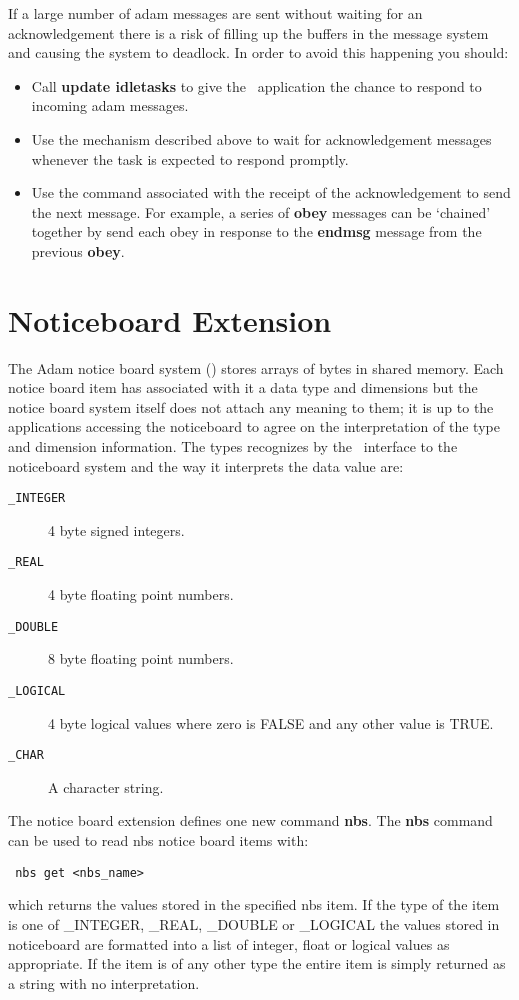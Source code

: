 If a large number of adam messages are sent without waiting for an 
acknowledgement there is a risk of filling up the buffers in the message 
system and causing the system to deadlock. In order to avoid this 
happening you should:
\begin{itemize}
\item Call {\bf update idletasks} to give the \Tcl\ application the chance 
to respond to incoming adam messages.
\item Use the mechanism described above to wait for acknowledgement 
messages whenever the task is expected to respond promptly.
\item Use the command associated with the receipt of the acknowledgement to
send the next message. For example, a series of {\bf obey} messages can 
be `chained'
together by send each obey in response to the {\bf endmsg} message from the
previous {\bf obey}.
\end{itemize}

\section{\label{noticeboard_extension}Noticeboard Extension}

The Adam notice board system () stores arrays of 
bytes in shared memory.
Each notice board item has associated with it a data type and dimensions but
the notice board system itself does not attach any meaning to them; it is
up to the applications accessing the noticeboard to agree on the interpretation
of the type and dimension information. The types recognizes by the \TclTk\ 
interface to the noticeboard system and the way it interprets the data 
value are:

\begin{description}
\item[{\tt \_INTEGER}] 4 byte signed integers.
\item[{\tt \_REAL}] 4 byte floating point numbers.
\item[{\tt \_DOUBLE}] 8 byte floating point numbers.
\item[{\tt \_LOGICAL}] 4 byte logical values where zero is FALSE and any 
other value is TRUE.
\item[{\tt \_CHAR}] A character string.
\end{description}

The notice board extension defines one new command {\bf nbs}. 
The {\bf nbs} command can be used to read nbs notice board items with:
\begin{tquote}{\tt
nbs get <nbs\_name>
}\end{tquote}
which returns the values stored in the specified nbs item. If the type of the
item is one of \_INTEGER, \_REAL, \_DOUBLE or \_LOGICAL the values stored in
noticeboard are formatted into a list of integer, float or logical values as
appropriate. If the item is of any other type the entire item is simply
returned as a string with no interpretation.

